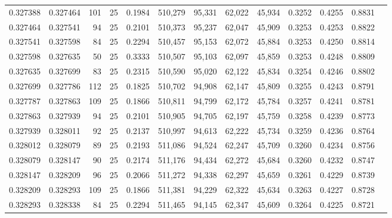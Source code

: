 \begin{tabular}{rrrrrrrrrrrrr}
0.327388 & 0.327464 &   101 &  25 &                                     0.1984 & 510,279 &  95,331 &  62,022 &  45,934 & 0.3252 & 0.4255 & 0.8831 \\
0.327464 & 0.327541 &    94 &  25 &                                     0.2101 & 510,373 &  95,237 &  62,047 &  45,909 & 0.3253 & 0.4253 & 0.8822 \\
0.327541 & 0.327598 &    84 &  25 &                                     0.2294 & 510,457 &  95,153 &  62,072 &  45,884 & 0.3253 & 0.4250 & 0.8814 \\
0.327598 & 0.327635 &    50 &  25 &                                     0.3333 & 510,507 &  95,103 &  62,097 &  45,859 & 0.3253 & 0.4248 & 0.8809 \\
0.327635 & 0.327699 &    83 &  25 &                                     0.2315 & 510,590 &  95,020 &  62,122 &  45,834 & 0.3254 & 0.4246 & 0.8802 \\
0.327699 & 0.327786 &   112 &  25 &                                     0.1825 & 510,702 &  94,908 &  62,147 &  45,809 & 0.3255 & 0.4243 & 0.8791 \\
0.327787 & 0.327863 &   109 &  25 &                                     0.1866 & 510,811 &  94,799 &  62,172 &  45,784 & 0.3257 & 0.4241 & 0.8781 \\
0.327863 & 0.327939 &    94 &  25 &                                     0.2101 & 510,905 &  94,705 &  62,197 &  45,759 & 0.3258 & 0.4239 & 0.8773 \\
0.327939 & 0.328011 &    92 &  25 &                                     0.2137 & 510,997 &  94,613 &  62,222 &  45,734 & 0.3259 & 0.4236 & 0.8764 \\
0.328012 & 0.328079 &    89 &  25 &                                     0.2193 & 511,086 &  94,524 &  62,247 &  45,709 & 0.3260 & 0.4234 & 0.8756 \\
0.328079 & 0.328147 &    90 &  25 &                                     0.2174 & 511,176 &  94,434 &  62,272 &  45,684 & 0.3260 & 0.4232 & 0.8747 \\
0.328147 & 0.328209 &    96 &  25 &                                     0.2066 & 511,272 &  94,338 &  62,297 &  45,659 & 0.3261 & 0.4229 & 0.8739 \\
0.328209 & 0.328293 &   109 &  25 &                                     0.1866 & 511,381 &  94,229 &  62,322 &  45,634 & 0.3263 & 0.4227 & 0.8728 \\
0.328293 & 0.328338 &    84 &  25 &                                     0.2294 & 511,465 &  94,145 &  62,347 &  45,609 & 0.3264 & 0.4225 & 0.8721 \\

\end{tabular}
